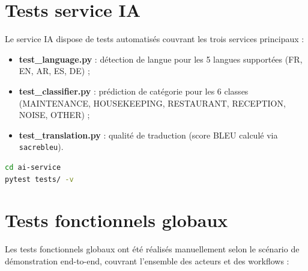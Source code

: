 \section{Tests service IA}
\label{sec:tests_ia}

Le service IA dispose de tests automatisés couvrant les trois services principaux :

\begin{itemize}
  \item \textbf{test\_language.py} : détection de langue pour les 5 langues supportées (FR, EN, AR, ES, DE) ;
  \item \textbf{test\_classifier.py} : prédiction de catégorie pour les 6 classes (MAINTENANCE, HOUSEKEEPING, RESTAURANT, RECEPTION, NOISE, OTHER) ;
  \item \textbf{test\_translation.py} : qualité de traduction (score BLEU calculé via \texttt{sacrebleu}).
\end{itemize}

\begin{lstlisting}[language=bash, caption={Exécution des tests du service IA}]
cd ai-service
pytest tests/ -v
\end{lstlisting}


\section{Tests fonctionnels globaux}
\label{sec:tests_fonctionnels}

Les tests fonctionnels globaux ont été réalisés manuellement selon le scénario de démonstration end-to-end, couvrant l'ensemble des acteurs et des workflows :

